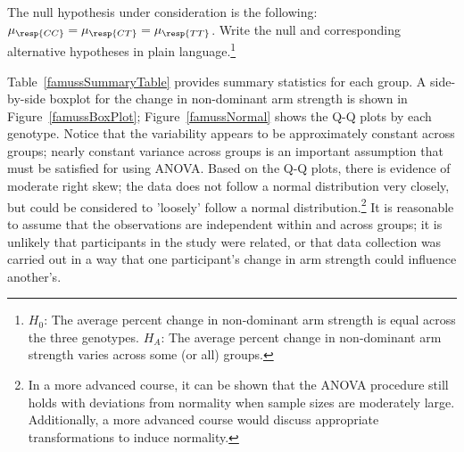\begin{exercise} \label{nullHypForFamuss}
	The null hypothesis under consideration is the following: $\mu_{\resp{CC}} = \mu_{\resp{CT}} = \mu_{\resp{TT}}$.
	Write the null and corresponding alternative hypotheses in plain language.\footnote{$H_0$: The average percent change in non-dominant arm strength is equal across the three genotypes. $H_A$: The average percent change in non-dominant arm strength varies across some (or all) groups.}
\end{exercise}

Table~\ref{famussSummaryTable} provides summary statistics for each group. A side-by-side boxplot for the change in non-dominant arm strength is shown in Figure~\ref{famussBoxPlot}; Figure~\ref{famussNormal} shows the Q-Q plots by each genotype. Notice that the variability appears to be approximately constant across groups; nearly constant variance across groups is an important assumption that must be satisfied for using ANOVA. Based on the Q-Q plots, there is evidence of moderate right skew; the data does not follow a normal distribution very closely, but could be considered to 'loosely' follow a normal distribution.\footnote{In a more advanced course, it can be shown that the ANOVA procedure still holds with deviations from normality when sample sizes are moderately large. Additionally, a more advanced course would discuss appropriate transformations to induce normality.} It is reasonable to assume that the observations are independent within and across groups; it is unlikely that participants in the study were related, or that data collection was carried out in a way that one participant's change in arm strength could influence another's. 


